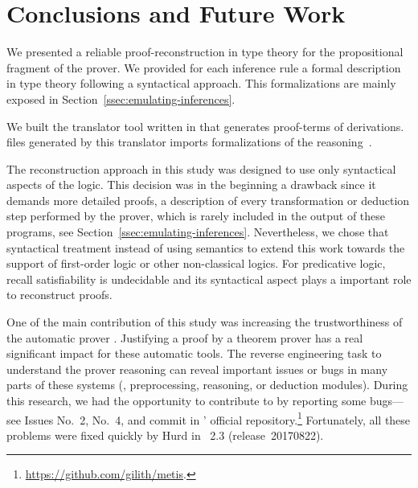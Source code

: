 \documentclass[../main.tex]{subfiles}
\begin{document}

\section{Conclusions and Future Work}
\label{sec:conclusions}

We presented a reliable proof-reconstruction in type theory
for the propositional fragment of the \Metis prover. We provided for
each \Metis inference rule a formal description in type theory
following a syntactical approach.
This formalizations are mainly exposed in
Section~\ref{ssec:emulating-inferences}.

We built the \Athena translator tool written in \Haskell
that generates \Agda proof-terms of \Metis derivations.
\Agda files generated by this translator imports
\Agda formalizations of the \Metis reasoning~\cite{AgdaProp,AgdaMetis}.

The reconstruction approach in this study was designed to use
only syntactical aspects of the logic.
This decision was in the beginning a drawback
since it demands more detailed proofs, a
description of every transformation or deduction step performed by
the prover, which is rarely included in the output of these programs,
see Section~\ref{ssec:emulating-inferences}.
Nevertheless, we chose that syntactical treatment instead of using
semantics to extend this work towards the support of first-order logic
or other non-classical logics.
For predicative logic, recall satisfiability is undecidable and
its syntactical aspect plays a important role to reconstruct proofs.

One of the main contribution of this study was increasing the
trustworthiness of the automatic prover \Metis. Justifying a proof by
a theorem prover has a real significant impact for these automatic
tools.  The reverse engineering task to understand the prover
reasoning can reveal important issues or bugs in many parts of these
systems (\eg, preprocessing, reasoning, or deduction modules). During
this research, we had the opportunity to contribute to \Metis by
reporting some bugs---see Issues No.~2, No.~4, and commit
 in \Metis' official
repository.\footnote{\url{https://github.com/gilith/metis}.}
Fortunately, all these problems were fixed quickly by Hurd in
\Metis~2.3 (release~20170822).
\end{document}

